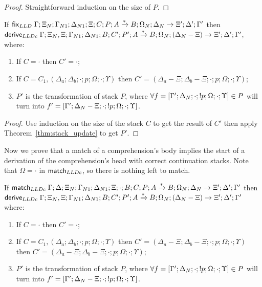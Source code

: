 \begin{proof}
Straightforward induction on the size of $P$.
\end{proof}

\begin{theorem}\label{thm:from_update_to_derivation}
   If $\mathsf{fix}_{LLD} \; \Gamma; \Xi_N; \Gamma_{N1}; \Delta_{N1}; \Xi; C; P; A \xrightarrow{*} B; \Omega_N; \Delta_N \rightarrow \Xi'; \Delta'; \Gamma'$ then
  $\mathsf{derive}_{LLDc} \; \Gamma; \Xi_N, \Xi; \Gamma_{N1}; \Delta_{N1}; B; C' ; P'; A \xrightarrow{*} B; \Omega_N; (\Delta_N - \Xi) \rightarrow \Xi'; \Delta'; \Gamma'$, where:

\begin{enumerate}
   \item If $C = \cdot$ then $C' = \cdot$;
   \item If $C = C_1, (\Delta_a; \Delta_b; \cdot; p; \Omega; \cdot; \Upsilon)$ then $C' = (\Delta_a - \Xi; \Delta_b - \Xi; \cdot; p; \Omega; \cdot; \Upsilon)$;
   \item $P'$ is the transformation of stack $P$, where $\forall f = [\Gamma'; \Delta_N; \cdot; {!} p; \Omega; \cdot; \Upsilon] \in P$ will turn into \linebreak $f'=[\Gamma';\Delta_N-\Xi;\cdot;{!} p;\Omega;\cdot;\Upsilon]$.
\end{enumerate}
\end{theorem}

\begin{proof}
Use induction on the size of the stack $C$ to get the result of $C'$ then apply Theorem~\ref{thm:stack_update} to get $P'$.
\end{proof}

Now we prove that a match of a comprehension's body implies the start of a derivation of the comprehension's head with correct continuation stacks. Note that $\Omega = \cdot$ in $\mathsf{match}_{LLDc}$, so there is nothing left to match.

\begin{lemma}
   If $\mathsf{match}_{LLDc} \; \Gamma; \Delta; \Xi_N; \Gamma_{N1}; \Delta_{N1}; \Xi; \cdot; B; C; P; A \xrightarrow{*} B;\Omega_N; \Delta_N \rightarrow \Xi'; \Delta'; \Gamma'$ then
      $\mathsf{derive}_{LLDc} \; \Gamma; \Xi_N, \Xi; \Gamma_{N1}; \Delta_{N1}; B; C'; P'; A \xrightarrow{*} B; \Omega_N; (\Delta_N - \Xi) \rightarrow \Xi'; \Delta'; \Gamma'$ where:
   
   \begin{enumerate}
      \item If $C = \cdot$ then $C' = \cdot$;
      \item If $C = C_1, (\Delta_a; \Delta_b; \cdot; p; \Omega; \cdot; \Upsilon)$ then $C' = (\Delta_a - \Xi; \Delta_b - \Xi; \cdot; p; \Omega; \cdot; \Upsilon)$ then \linebreak $C' = (\Delta_a - \Xi; \Delta_b - \Xi; \cdot; p; \Omega; \cdot; \Upsilon)$;
      \item $P'$ is the transformation of stack $P$, where $\forall f = [\Gamma'; \Delta_N; \cdot; {!} p; \Omega; \cdot; \Upsilon] \in P$ will turn into \linebreak $f' = [\Gamma'; \Delta_N - \Xi; \cdot; {!} p; \Omega; \cdot; \Upsilon]$.
   \end{enumerate}
\end{lemma}

